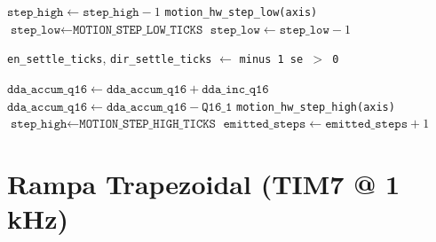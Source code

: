 \begin{algorithm}[H]
  \caption{Atualiza\c{c}\~ao do DDA Q16.16 no TIM6 (por eixo)}
  \label{alg:dda-q16}
  \begin{algorithmic}[1]
      \State {}
        \State $\texttt{step\_high} \gets \texttt{step\_high} - 1$
          \State \texttt{motion\_hw\_step\_low(axis)}
          \State $\texttt{step\_low} \gets \texttt{MOTION\_STEP\_LOW\_TICKS}$
        \EndIf
        \State \Return
      \EndIf
        \State $\texttt{step\_low} \gets \texttt{step\_low} - 1$
        \State \Return
      \EndIf

        \State \Return {}
      \EndIf

        \State \texttt{en\_settle\_ticks}, \texttt{dir\_settle\_ticks} $\gets$ \texttt{minus 1 se $>$ 0}
        \State \Return {}
      \EndIf

      \State {}
      \State $\texttt{dda\_accum\_q16} \gets \texttt{dda\_accum\_q16} + \texttt{dda\_inc\_q16}$
        \State $\texttt{dda\_accum\_q16} \gets \texttt{dda\_accum\_q16} - \texttt{Q16\_1}$
        \State \texttt{motion\_hw\_step\_high(axis)}
        \State $\texttt{step\_high} \gets \texttt{MOTION\_STEP\_HIGH\_TICKS}$
        \State $\texttt{emitted\_steps} \gets \texttt{emitted\_steps} + 1$
      \EndIf
    \EndProcedure
  \end{algorithmic}
\end{algorithm}

\FloatBarrier
\section{Rampa Trapezoidal (TIM7 @ 1\,kHz)}
\label{sec:rampa}

